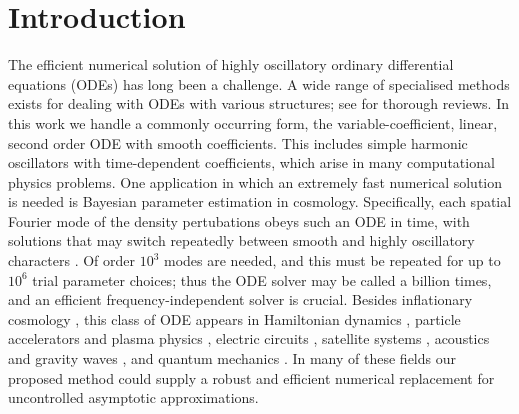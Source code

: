 \documentclass[10pt]{article}
\newcommand{\Fruzsi}[1]{{\color{blue}#1}}
\begin{document}
\section{Introduction}\label{introduction}

The efficient numerical solution of highly oscillatory ordinary differential
equations (ODEs) has long been a challenge.
A wide range of specialised methods exists for dealing with ODEs
with various structures;
see \cite{petzold1997,engquist2009} for thorough reviews.
In this work we handle a commonly occurring
form, the variable-coefficient, linear, second
order ODE with
smooth coefficients.
This includes simple %
harmonic oscillators with time-dependent coefficients,
which arise in many computational physics problems.
One application in which an extremely fast numerical solution is needed
is Bayesian parameter estimation in cosmology.
Specifically, each spatial Fourier mode of the density pertubations
obeys such an ODE in time,
with solutions that may switch repeatedly between smooth and
highly oscillatory characters \cite{agocs2020dense}.
Of order $10^3$ modes are needed, and this must be repeated for
up to $10^6$ trial parameter choices; thus the ODE solver
may be called a billion times, and an efficient frequency-independent
solver is crucial.
Besides inflationary cosmology \cite{Hergt2022,martin2003,winitzki2005}, this class of ODE appears in
Hamiltonian dynamics \cite{Pritula2018,fiore2022}, particle accelerators and plasma physics
\cite{courant1958,davidson2001,hazeltine2003,lewis1968}, electric circuits
\cite{likharev2022}, satellite systems \cite{saxena2020}, acoustics and gravity waves \cite{filippi1998,einaudi1970}, and quantum mechanics \cite{griffiths2018,adhikari1988,arnold2011wkb,cea1982}.
In many of these fields our proposed method could supply a robust and efficient
numerical replacement for
uncontrolled asymptotic approximations.
\end{document}
